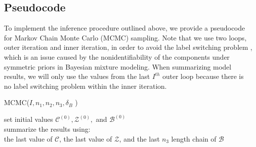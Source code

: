 \documentclass[a4paper]{article}
\begin{document}
\subsection{Pseudocode}
To implement the inference procedure outlined above, we provide a pseudocode for Markov Chain Monte Carlo (MCMC) sampling. Note that we use two loops, outer iteration and inner iteration, in order to avoid the label switching problem \citep{jasra2005markov}, which is an issue caused by the nonidentifiability of the components under symmetric priors in Bayesian mixture modeling. When summarizing model results, we will only use the values from the last $I^{th}$ outer loop because there is no label switching problem within the inner iteration.
 \begin{algorithm}[H]
 	\SetAlgoLined
 	\caption{MCMC($I, n_1, n_2, n_3, \delta_B$ )}
    set initial values $\mathcal{C}^{(0)}, \mathcal{Z}^{(0)},$ and $\mathcal{B}^{(0)}$\\
 		summarize the results using:\\ the last value of $\mathcal{C}$, the last value of $\mathcal{Z}$, and the last $n_3$ length chain of $\mathcal{B}$
 	\end{algorithm}
\end{document}
